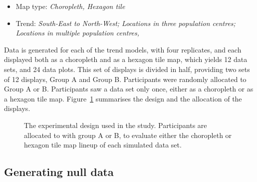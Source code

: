 \documentclass[
doublespace,
  times]{anzsauth}
\providecommand{\tightlist}{%
  \setlength{\itemsep}{0pt}\setlength{\parskip}{0pt}}
\begin{document}
\begin{itemize}
\tightlist
\item
  Map type: \emph{Choropleth, Hexagon tile}
\item
  Trend: \emph{South-East to North-West; Locations in three population
  centres; Locations in multiple population centres, }
\end{itemize}

Data is generated for each of the trend models, with four replicates,
and each displayed both as a choropleth and as a hexagon tile map, which
yields 12 data sets, and 24 data plots. This set of displays is divided
in half, providing two sets of 12 displays, Group A and Group B.
Participants were randomly allocated to Group A or B. Participants saw a
data set only once, either as a choropleth or as a hexagon tile map.
Figure~\ref{fig-exp-design} summarises the design and the allocation of
the displays.

\begin{figure}


\caption{\label{fig-exp-design}The experimental design used in the
study. Participants are allocated to with group A or B, to evaluate
either the choropleth or hexagon tile map lineup of each simulated data
set.}

\end{figure}%

\subsection{Generating null data}\label{generating-null-data}
\end{document}
